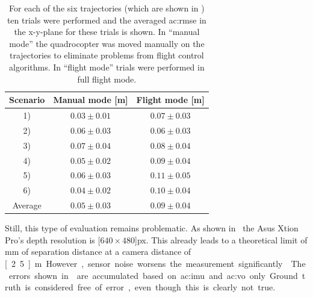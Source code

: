 \begin{table}[]
  \centering
  \begin{tabular}{ccc}
    \toprule
    Scenario & Manual mode [m] & Flight mode [m]\\
    \midrule
    1) &  $0.03 \pm 0.01$  & $0.07 \pm 0.03$\\
    2) &  $0.06 \pm 0.03$  & $0.06 \pm 0.03$\\
    3) &  $0.07 \pm 0.04$  & $0.08 \pm 0.04$\\
    4) &  $0.05 \pm 0.02$  & $0.09 \pm 0.04$\\
    5) &  $0.06 \pm 0.03$  & $0.11 \pm 0.05$\\
    6) &  $0.04 \pm 0.02$  & $0.10 \pm 0.04$\\
    \midrule
    Average & $0.05 \pm 0.03$   & $0.09 \pm 0.04$\\
    \bottomrule
  \end{tabular}
  \caption{For each of the six trajectories (which are shown in ) ten trials were performed and the averaged \gls{ac:rmse} in the x-y-plane for these trials is shown. In ``manual mode'' the quadrocopter was moved manually on the trajectories to eliminate problems from flight control algorithms. In ``flight mode'' trials were performed in full flight mode.}
  \label{tab:robot_experiments_rmsdresults}
\end{table}

Still, this type of evaluation remains problematic.
As shown in~\cite{haggag2013measuring, diaz2015analysis} the Asus Xtion Pro's depth resolution is \unit[$640 \times 480$]{px}.
This already leads to a theoretical limit of \unit[14]{mm} of separation distance at a camera distance of \unit[2.5]{m}.
However, sensor noise worsens the measurement significantly~\cite{haggag2013measuring, diaz2015analysis}.
The errors shown in  are accumulated based on \gls{ac:imu} and \gls{ac:vo} only.
Ground truth is considered free of error, even though this is clearly not true.

